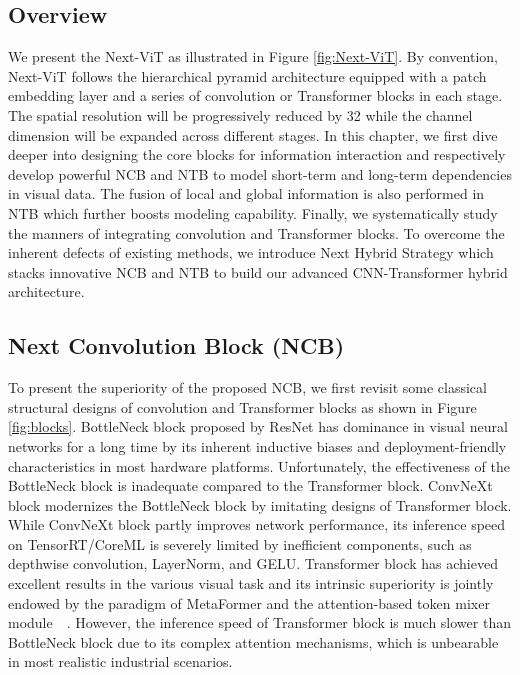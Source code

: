 \documentclass[10pt,twocolumn,letterpaper]{article}
\begin{document}
\subsection{Overview}
We present the Next-ViT as illustrated in Figure \ref{fig:Next-ViT}.
By convention, Next-ViT follows the hierarchical pyramid architecture equipped with a patch embedding layer and a series of convolution or Transformer blocks in each stage.
The spatial resolution will be progressively reduced by 32 while the channel dimension will be expanded across different stages. 
In this chapter, we first dive deeper into designing the core blocks for information interaction and respectively develop powerful NCB and NTB to model short-term and long-term dependencies in visual data. The fusion of local and global information is also performed in NTB which further boosts modeling capability. Finally, we systematically study the manners of integrating convolution and Transformer blocks. To overcome the inherent defects of existing methods, we introduce Next Hybrid Strategy which stacks innovative NCB and NTB to build our advanced CNN-Transformer hybrid architecture.


\subsection{Next Convolution Block (NCB)}
To present the superiority of the proposed NCB, we first revisit some classical structural designs of convolution and Transformer blocks as shown in Figure \ref{fig:blocks}. BottleNeck block proposed by ResNet\cite{ResNet} has dominance in visual neural networks for a long time by its inherent inductive biases and deployment-friendly characteristics in most hardware platforms. Unfortunately, the effectiveness of the BottleNeck block is inadequate compared to the Transformer block. ConvNeXt block\cite{ConvNext} modernizes the BottleNeck block by imitating designs of Transformer block. While ConvNeXt block partly improves network performance, its inference speed on TensorRT/CoreML is severely limited by inefficient components, such as  depthwise convolution, LayerNorm, and GELU. Transformer block has achieved excellent results in the various visual task and its intrinsic superiority is jointly endowed by the paradigm of MetaFormer\cite{metaformer} and the attention-based token mixer module~\cite{Swin}~\cite{CSWin}. However, the inference speed of Transformer block is much slower than BottleNeck block due to its complex attention mechanisms, which is unbearable in most realistic industrial scenarios.
\end{document}
